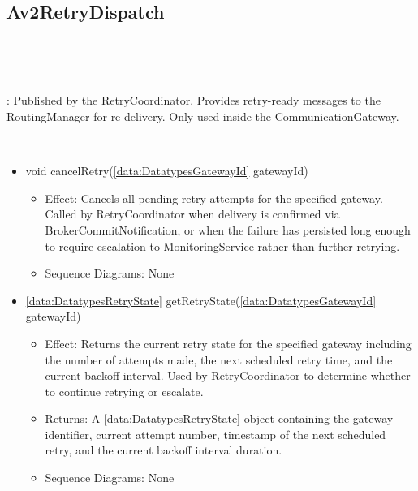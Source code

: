   \subsection{Av2RetryDispatch}\label{int:InterfacesAv2RetryDispatch}
    \begin{description}
      \item[Provided by:] \iconcomponent{}~
      \item[Required by:] \iconcomponent{}~ 
           \item[Description]: Published by the RetryCoordinator. Provides retry-ready messages to the RoutingManager for re-delivery. Only used inside the CommunicationGateway.
      \item[Operations:] ~
    \begin{itemize}[noitemsep,nolistsep,leftmargin=-.25cm]
      \item \textsf{void cancelRetry(\ref{data:DatatypesGatewayId} gatewayId)}
        \begin{itemize}[noitemsep,nolistsep]
           \item Effect: Cancels all pending retry attempts for the specified gateway. Called by RetryCoordinator when delivery is confirmed via BrokerCommitNotification, or when the failure has persisted long enough to require escalation to MonitoringService rather than further retrying. 
           \item Sequence Diagrams: None
        \end{itemize}
      \item \textsf{\ref{data:DatatypesRetryState} getRetryState(\ref{data:DatatypesGatewayId} gatewayId)}
        \begin{itemize}[noitemsep,nolistsep]
           \item Effect: Returns the current retry state for the specified gateway including the number of attempts made, the next scheduled retry time, and the current backoff interval. Used by RetryCoordinator to determine whether to continue retrying or escalate. 
           \item Returns: A \ref{data:DatatypesRetryState} object containing the gateway identifier, current attempt number, timestamp of the next scheduled retry, and the current backoff interval duration.
           \item Sequence Diagrams: None
        \end{itemize}

\end{itemize}
\end{description}
